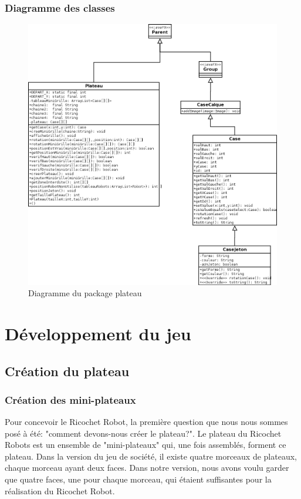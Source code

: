 \documentclass[a4paper, 12pt]{article}
\begin{document}
            \newpage
            
        \subsubsection{Diagramme des classes}
        
            \begin{figure}[H]
                \centering
                \includegraphics[scale=0.45]{images/diagrammePlateau.png}
                \caption{Diagramme du package plateau}
            \end{figure}
            
            

\section{Développement du jeu}
    \subsection{Création du plateau}
        \subsubsection{Création des mini-plateaux}
            Pour concevoir le Ricochet Robot, la première question que nous nous sommes posé à été: "comment devons-nous créer le plateau?". Le plateau du Ricochet Robots est un ensemble de "mini-plateaux" qui, une fois assemblés, forment ce plateau. Dans la version du jeu de société, il existe quatre morceaux de plateaux, chaque morceau ayant deux faces. Dans notre version, nous avons voulu garder que quatre faces, une pour chaque morceau, qui étaient suffisantes pour la réalisation du Ricochet Robot.
            
\end{document}
